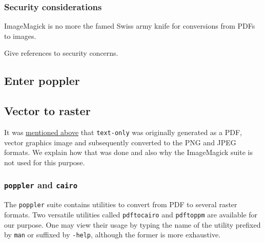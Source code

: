 \documentclass[
  11pt,
  british,
  a4paper,
]{article}
\begin{document}
\hypertarget{security-considerations}{%
\subsubsection{Security considerations}\label{security-considerations}}

ImageMagick is no more the famed Swiss army knife for conversions from
PDFs to images.

Give references to security concerns.

\hypertarget{enter-poppler}{%
\subsection{Enter poppler}\label{enter-poppler}}

\hypertarget{vector-to-raster}{%
\subsection{Vector to raster}\label{vector-to-raster}}

It was \protect\hyperlink{text-only-image}{mentioned above} that
\texttt{text-only} was originally generated as a PDF, vector graphics
image and subsequently converted to the PNG and JPEG formats. We explain
how that was done and also why the ImageMagick suite is not used for
this purpose.

\hypertarget{poppler-and-cairo}{%
\subsubsection{\texorpdfstring{\texttt{poppler} and
\texttt{cairo}}{poppler and cairo}}\label{poppler-and-cairo}}

The \texttt{poppler} suite contains utilities to convert from PDF to
several raster formats. Two versatile utilities called
\texttt{pdftocairo} and \texttt{pdftoppm} are available for our purpose.
One may view their usage by typing the name of the utility prefixed by
\texttt{man} or suffixed by \texttt{-help}, although the former is more
exhaustive.
\end{document}
